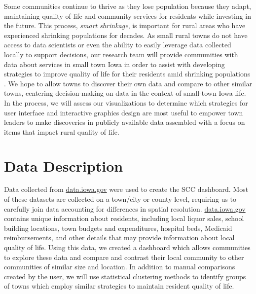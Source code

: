 \documentclass[10pt]{article}\usepackage[]{graphicx}\usepackage[]{color}
\begin{document}
Some communities continue to thrive as they lose population because they adapt, maintaining quality of life and community services for residents while investing in the future. %
This process, \emph{smart shrinkage}, is important for rural areas who have experienced shrinking populations for decades. 
As small rural towns do not have access to data scientists or even the ability to easily leverage data collected locally to support decisions, our research team will provide communities with data about services in small town Iowa in order to assist with developing strategies to improve quality of life for their residents amid shrinking populations \cite{scc}. We hope to allow towns to discover their own data and compare to other similar towns, centering decision-making on data in the context of small-town Iowa life. In the process, we will assess our visualizations to determine which strategies for user interface and interactive graphics design are most useful to empower town leaders to make discoveries in publicly available data assembled with a focus on items that impact rural quality of life.

\section{Data Description}
Data collected from \url{data.iowa.gov} were used to create the SCC dashboard. Most of these datasets are collected on a town/city or county level, requiring us to carefully join data accounting for differences in spatial resolution. \url{data.iowa.gov} contains unique information about residents, including local liquor sales, school building locations, town budgets and expenditures, hospital beds, Medicaid reimbursements, and other details that may provide information about local quality of life.
Using this data, we created a dashboard which allows communities to explore these data and compare and contrast their local community to other communities of similar size and location. In addition to manual comparisons created by the user, we will use statistical clustering methods to identify groups of towns which employ similar strategies to maintain resident quality of life.
\end{document}
